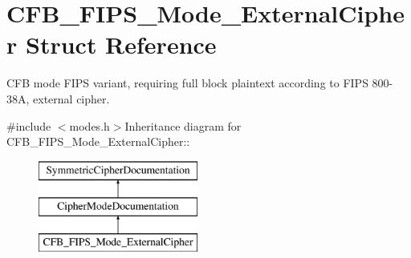 \hypertarget{struct_c_f_b___f_i_p_s___mode___external_cipher}{
\section{CFB\_\-FIPS\_\-Mode\_\-ExternalCipher Struct Reference}
\label{struct_c_f_b___f_i_p_s___mode___external_cipher}
}


CFB mode FIPS variant, requiring full block plaintext according to FIPS 800-\/38A, external cipher.  


{\ttfamily \#include $<$modes.h$>$}Inheritance diagram for CFB\_\-FIPS\_\-Mode\_\-ExternalCipher::\begin{figure}[H]
\begin{center}
\leavevmode
\includegraphics[height=3cm]{struct_c_f_b___f_i_p_s___mode___external_cipher}
\end{center}
\end{figure}
